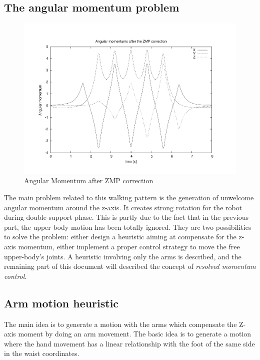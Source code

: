 \subsection{The angular momentum problem}
\begin{figure}[htb]
\begin{center}
\includegraphics[width=\linewidth]{./figures/PatternGenerator/AngularMomentum}
\caption{Angular Momentum after ZMP correction}
\label{pic:AngularMomentum}
\end{center}
\end{figure}


The main problem related to this walking pattern is the generation of
unwelcome angular momentum around the z-axis. It creates strong rotation
for the robot during double-support phase. This is partly due to the fact that
in the previous part, the upper body motion has been totally ignored.
They are two possibilities to solve the problem: either design a heuristic 
aiming at compensate for the z-axis momentum, either implement a proper
control strategy to move the free upper-body's joints.
A heuristic involving only the arms is described, and the remaining part
of this document will described the concept of \textit{resolved momentum control}.

\subsection{Arm motion heuristic}

The main idea is to generate a motion with the arms which compensate the Z-axis moment 
by doing an arm movement. The basic idea is to generate a motion where the hand movement
has a linear relationship with the foot of the same side in the waist coordinates.

